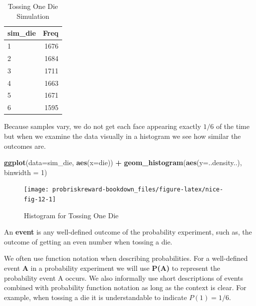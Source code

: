 \documentclass[]{book}
\newenvironment{Shaded}{\begin{snugshade}}{\end{snugshade}}
\newcommand{\KeywordTok}[1]{\textcolor[rgb]{0.13,0.29,0.53}{\textbf{#1}}}
\newcommand{\DataTypeTok}[1]{\textcolor[rgb]{0.13,0.29,0.53}{#1}}
\newcommand{\DecValTok}[1]{\textcolor[rgb]{0.00,0.00,0.81}{#1}}
\newcommand{\StringTok}[1]{\textcolor[rgb]{0.31,0.60,0.02}{#1}}
\newcommand{\OperatorTok}[1]{\textcolor[rgb]{0.81,0.36,0.00}{\textbf{#1}}}
\newcommand{\NormalTok}[1]{#1}
\theoremstyle{definition}
\theoremstyle{definition}
\theoremstyle{definition}
\theoremstyle{remark}
\begin{document}
\begin{table}

\caption{\label{tab:nice-tab-11}Tossing One Die Simulation}
\centering
\begin{tabular}[t]{lr}
\toprule
sim\_die & Freq\\
\midrule
1 & 1676\\
2 & 1684\\
3 & 1711\\
4 & 1663\\
5 & 1671\\
6 & 1595\\
\bottomrule
\end{tabular}
\end{table}

Because samples vary, we do not get each face appearing exactly \(1/6\)
of the time but when we examine the data visually in a histogram we see
how similar the outcomes are.

\begin{Shaded}
\begin{Highlighting}[]
\KeywordTok{ggplot}\NormalTok{(}\DataTypeTok{data=}\NormalTok{sim_die, }\KeywordTok{aes}\NormalTok{(}\DataTypeTok{x=}\NormalTok{die)) }\OperatorTok{+}\StringTok{ }\KeywordTok{geom_histogram}\NormalTok{(}\KeywordTok{aes}\NormalTok{(}\DataTypeTok{y=}\NormalTok{..density..), }\DataTypeTok{binwidth =} \DecValTok{1}\NormalTok{)}
\end{Highlighting}
\end{Shaded}

\begin{figure}

{\centering \texttt{[image: probriskreward-bookdown\_files/figure-latex/nice-fig-12-1]} 

}

\caption{Histogram for Tossing One Die}\label{fig:nice-fig-12}
\end{figure}

An \textbf{event} is any well-defined outcome of the probability
experiment, such as, the outcome of getting an even number when tossing
a die.

We often use function notation when describing probabilities. For a
well-defined event \textbf{A} in a probability experiment we will use
\textbf{P(A)} to represent the probability event A occurs. We also
informally use short descriptions of events combined with probability
function notation as long as the context is clear. For example, when
tossing a die it is understandable to indicate \(P(1) = 1/6\).
\end{document}
